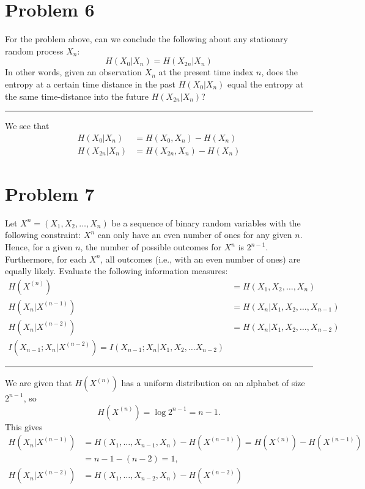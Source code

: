 \documentclass{article}
\newcommand{\horline}
           {\begin{center}
              \noindent\rule{8cm}{0.4pt}
            \end{center}}
\begin{document}
\section*{Problem 6}
For the problem above, can we conclude the following about any stationary
random process $X_n$:
$$
H(X_0 | X_n) = H(X_{2n} | X_n)
$$
In other words, given an observation $X_n$ at the present time index $n$,
does the entropy at a certain time distance in the past $H(X_0 | X_n)$ 
equal the entropy at the same time-distance into the future 
$H(X_{2n} | X_n)$?
\horline
We see that
\begin{align*}
H(X_0 | X_n) &= H(X_0, X_n) - H(X_n)\\
H(X_{2n} | X_n) &= H(X_{2n}, X_n) - H(X_n)
\end{align*}

\section*{Problem 7}
Let $X^n = (X_1, X_2, \dots, X_n)$ be a sequence of binary random variables
with the following constraint: $X^n$ can only have an even number of ones
for any given $n$. Hence, for a given $n$, the number of possible outcomes
for $X^n$ is $2^{n-1}$. Furthermore, for each $X^n$, all outcomes
(i.e., with an even number of ones) are equally likely. Evaluate the 
following information measures:
\begin{align*}
  H(X^{(n)}) &= H(X_1, X_2, \dots, X_n) \\
  H(X_n | X^{(n-1)}) &= H(X_n | X_1, X_2, \dots, X_{n-1}) \\
  H(X_n | X^{(n-2)}) &= H(X_n | X_1, X_2, \dots, X_{n-2}) \\
  I(X_{n-1} ; X_n | X^{(n-2)}) = I(X_{n-1}; X_n | X_1, X_2, \dots X_{n-2}) 
\end{align*}
\horline
We are given that $H(X^{(n)})$ has a uniform distribution on an alphabet of
size $2^{n-1}$, so 
$$H(X^{(n)}) = \log 2^{n-1} = n-1.$$
This gives
\begin{align*}
H(X_n | X^{(n-1)}) 
  &= H(X_1, \dots, X_{n-1}, X_n) - H(X^{(n-1)}) = H(X^{(n)}) - H(X^{(n-1)})
\\&= n-1 - (n-2) = 1, \\
H(X_n | X^{(n-2)}) &= H(X_1, \dots, X_{n-2}, X_n) - H(X^{(n-2)}) \\
\end{align*}
\end{document}
